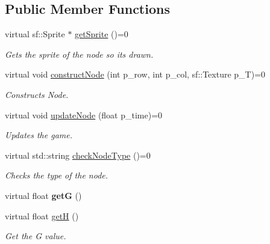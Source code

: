 \subsection*{Public Member Functions}
\begin{DoxyCompactItemize}
\item 
\mbox{\label{class_node_interface_a3d79c567537e9ffa7d2fc821495879fb}} 
virtual sf\+::\+Sprite $\ast$ \mbox{\hyperlink{class_node_interface_a3d79c567537e9ffa7d2fc821495879fb}{get\+Sprite}} ()=0
\begin{DoxyCompactList}\small\item\em Gets the sprite of the node so its drawn. \end{DoxyCompactList}\item 
\mbox{\label{class_node_interface_aba153b8ff03f15ce596887357a11aed8}} 
virtual void \mbox{\hyperlink{class_node_interface_aba153b8ff03f15ce596887357a11aed8}{construct\+Node}} (int p\+\_\+row, int p\+\_\+col, sf\+::\+Texture p\+\_\+T)=0
\begin{DoxyCompactList}\small\item\em Constructs Node. \end{DoxyCompactList}\item 
virtual void \mbox{\hyperlink{class_node_interface_a9aeb69f061905e96ef6b1983c7a88fe3}{update\+Node}} (float p\+\_\+time)=0
\begin{DoxyCompactList}\small\item\em Updates the game. \end{DoxyCompactList}\item 
virtual std\+::string \mbox{\hyperlink{class_node_interface_a944dbfa74de55bdef1d583f318888aeb}{check\+Node\+Type}} ()=0
\begin{DoxyCompactList}\small\item\em Checks the type of the node. \end{DoxyCompactList}\item 
\mbox{\label{class_node_interface_acc8dffd1dde9232e7541fff5b54783f0}} 
virtual float {\bfseries getG} ()
\item 
\mbox{\label{class_node_interface_a934ef1f220c6f61fa86200bd19586224}} 
virtual float \mbox{\hyperlink{class_node_interface_a934ef1f220c6f61fa86200bd19586224}{getH}} ()
\begin{DoxyCompactList}\small\item\em Get the G value. \end{DoxyCompactList}\item 

\end{DoxyCompactItemize}
